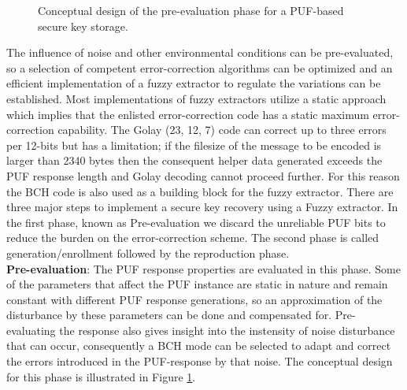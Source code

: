 \begin{figure}[htp]
\centering
{}
\caption{Conceptual design of the pre-evaluation phase for a PUF-based secure key storage.}
\label{img:fz_1}
\end{figure}
The influence of noise and other environmental conditions can be pre-evaluated, so a selection of competent error-correction algorithms can be optimized and an efficient implementation of a fuzzy extractor to regulate the variations can be established. Most implementations of fuzzy extractors utilize a static approach which implies that the enlisted error-correction code has a static maximum error-correction capability. The Golay (23, 12, 7) code can correct up to three errors per 12-bits but has a
limitation; if the filesize of the message to be encoded is larger than 2340 bytes then the consequent helper data generated exceeds the PUF response length and Golay decoding cannot proceed further. For this reason the BCH code is also used as a building block for the fuzzy extractor. There are three major steps to implement a secure key recovery using a Fuzzy extractor. In the first phase, known as Pre-evaluation we discard the unreliable PUF bits to reduce the burden on the error-correction scheme. The second phase is called generation/enrollment followed by the reproduction phase.\\

\textbf{Pre-evaluation}: The PUF response properties are evaluated in this phase. Some of the parameters that affect the PUF instance are static in nature and remain constant with different PUF response generations, so an approximation of the disturbance by these parameters can be done and compensated for. Pre-evaluating the response also gives insight into the instensity of noise disturbance that can occur, consequently a BCH mode can be selected to adapt and correct the errors introduced in the PUF-response by that noise. The conceptual
design for this phase is illustrated in Figure \ref{img:fz_1}.\\

